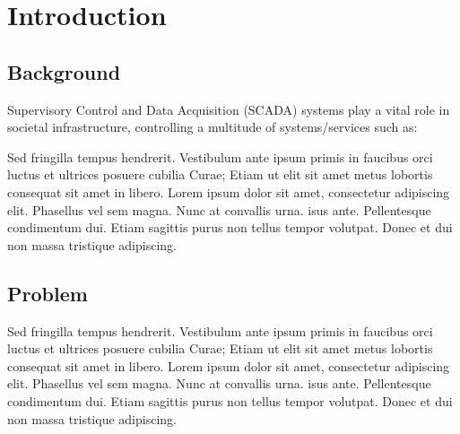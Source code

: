 \section*{\color{NavyBlue}Introduction}

\large

\subsection*{Background}

Supervisory Control and Data Acquisition (SCADA) systems play a vital role in
societal infrastructure, controlling a multitude of systems/services such as:

Sed fringilla tempus hendrerit. Vestibulum ante ipsum primis in faucibus orci
luctus et ultrices posuere cubilia Curae; Etiam ut elit sit amet metus lobortis
consequat sit amet in libero. Lorem ipsum dolor sit amet, consectetur
adipiscing elit. Phasellus vel sem magna. Nunc at convallis urna. isus ante.
Pellentesque condimentum dui. Etiam sagittis purus non tellus tempor volutpat. 
Donec et dui non massa tristique adipiscing.

\subsection*{Problem}

Sed fringilla tempus hendrerit. Vestibulum ante ipsum primis in faucibus orci
luctus et ultrices posuere cubilia Curae; Etiam ut elit sit amet metus lobortis
consequat sit amet in libero. Lorem ipsum dolor sit amet, consectetur
adipiscing elit. Phasellus vel sem magna. Nunc at convallis urna. isus ante.
Pellentesque condimentum dui. Etiam sagittis purus non tellus tempor volutpat. 
Donec et dui non massa tristique adipiscing.

